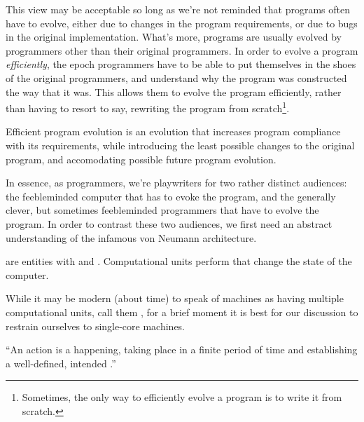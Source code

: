 This view may be acceptable so long as we're not reminded that programs often
have to evolve, either due to changes in the program requirements, or due to
bugs in the original implementation. What's more, programs are usually evolved
by programmers other than their original programmers. In order to evolve a
program \emph{efficiently}, the epoch programmers have to be able to put
themselves in the shoes of the original programmers, and understand why the
program was constructed the way that it was.  This allows them to evolve the
program efficiently, rather than having to resort to say, rewriting the program
from scratch\footnote{Sometimes, the only way to efficiently evolve a program
is to write it from scratch.}.

\begin{definition}

Efficient program evolution is an evolution that increases program compliance
with its requirements, while introducing the least possible changes to the
original program, and accomodating possible future program  evolution.

\end{definition}

In essence, as programmers, we're playwriters for two rather distinct
audiences: the feebleminded computer that has to evoke the program, and the
generally clever, but sometimes feebleminded programmers that have to evolve
the program. In order to contrast these two audiences, we first need an
abstract understanding of the infamous von Neumann architecture.

\begin{definition}

 are entities with  and .
Computational units perform  that change the state of the
computer.

\end{definition}

While it may be modern (about time) to speak of machines as having multiple
computational units, call them , for a brief moment it is best for
our discussion to restrain ourselves to single-core machines.

\begin{definition}

``An action is a happening, taking place in a finite period of time and
establishing a well-defined, intended .''
\cite{dijkstra-introduction}

\end{definition}

